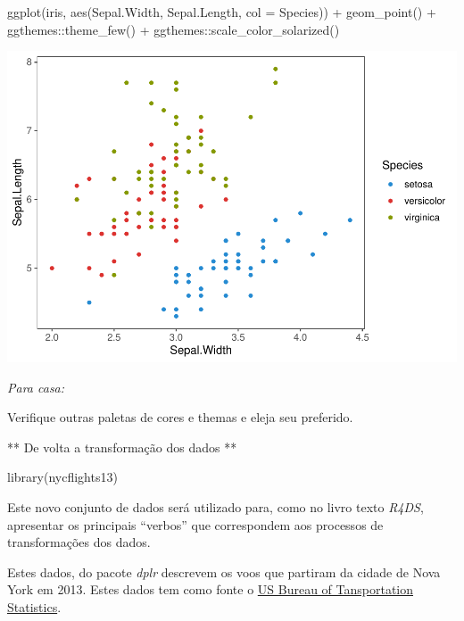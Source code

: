 \documentclass[
]{article}
\newenvironment{Shaded}{\begin{snugshade}}{\end{snugshade}}
\newcommand{\AttributeTok}[1]{\textcolor[rgb]{0.77,0.63,0.00}{#1}}
\newcommand{\FunctionTok}[1]{\textcolor[rgb]{0.00,0.00,0.00}{#1}}
\newcommand{\NormalTok}[1]{#1}
\newcommand{\SpecialCharTok}[1]{\textcolor[rgb]{0.00,0.00,0.00}{#1}}
\begin{document}
\begin{Shaded}
\begin{Highlighting}[]
\FunctionTok{ggplot}\NormalTok{(iris, }\FunctionTok{aes}\NormalTok{(Sepal.Width, Sepal.Length, }\AttributeTok{col =}\NormalTok{ Species)) }\SpecialCharTok{+} 
  \FunctionTok{geom\_point}\NormalTok{() }\SpecialCharTok{+} 
\NormalTok{  ggthemes}\SpecialCharTok{::}\FunctionTok{theme\_few}\NormalTok{() }\SpecialCharTok{+} 
\NormalTok{  ggthemes}\SpecialCharTok{::}\FunctionTok{scale\_color\_solarized}\NormalTok{() }
\end{Highlighting}
\end{Shaded}

\includegraphics{mind2_files/figure-latex/unnamed-chunk-9-1.pdf}

\emph{\emph{Para casa:}}

Verifique outras paletas de cores e themas e eleja seu preferido.

** De volta a transformação dos dados **

\begin{Shaded}
\begin{Highlighting}[]
\FunctionTok{library}\NormalTok{(nycflights13)}
\end{Highlighting}
\end{Shaded}

Este novo conjunto de dados será utilizado para, como no livro texto
\emph{R4DS}, apresentar os principais ``verbos'' que correspondem aos
processos de transformações dos dados.

Estes dados, do pacote \emph{dplr} descrevem os voos que partiram da
cidade de Nova York em 2013. Estes dados tem como fonte o
\href{https://www.transtats.bts.gov/DatabaseInfo.asp?DB_ID=120\&Link=0}{US
Bureau of Tansportation Statistics}.
\end{document}
